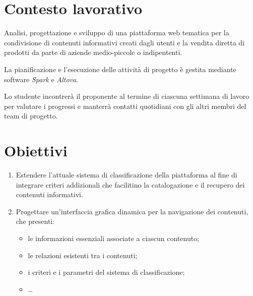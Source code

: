 \documentclass[10pt,a4paper,hidelinks]{scrartcl} %
\begin{document}
    \title{\rmfamily\normalfont{}}
    \author{}
    \date{\today}
    
    \maketitle
    
    \begin{abstract}
        \noindent Piano di lavoro settimanale per stage esterno presso \textsf{FondaMente}.
    \end{abstract}
    
	\tableofcontents

    \section{Contesto lavorativo}
	Analisi, progettazione e sviluppo di una piattaforma web tematica per la condivisione di contenuti informativi creati dagli utenti e la vendita diretta di prodotti da parte di aziende medio-piccole o indipententi.
	
	La pianificazione e l'esecuzione delle attività di progetto è gestita mediante software \textit{Spark} e \textit{Altova}.

	Lo studente incontrerà il proponente al termine di ciascuna settimana di lavoro per valutare i progressi e manterrà contatti quotidiani con gli altri membri del team di progetto.

	\section{Obiettivi}
	\begin{enumerate}
		\item Estendere l'attuale sistema di classificazione della piattaforma al fine di integrare criteri addizionali che facilitino la catalogazione e il recupero dei contenuti informativi.
		\item Progettare un'interfaccia grafica dinamica per la navigazione dei contenuti, che presenti:
		\begin{itemize}
			\item le informazioni essenziali associate a ciascun contenuto;
			\item le relazioni esistenti tra i contenuti;
			\item i criteri e i parametri del sistema di classificazione;
			\item \ldots
		\end{itemize}
	\end{enumerate}
\end{document}
